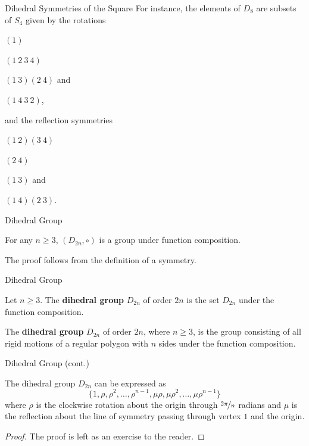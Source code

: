 \documentclass{beamer}
\begin{document}
\begin{frame}{Dihedral Symmetries of the Square}
For instance, the elements of $D_{8}$ are subsets of $S_4$ given by the rotations
\begin{enumerate}
\begin{multicols}{2}
    \item $(1)$
    \item $(1 \ 2 \ 3 \ 4)$
    \item $(1 \ 3)(2 \ 4)$ and
    \item $(1 \ 4 \ 3 \ 2)$,
    \end{multicols}
\end{enumerate}
and the reflection symmetries
\begin{enumerate}
\begin{multicols}{2}
    \item $(1 \ 2)(3 \ 4)$
    \item $(2 \ 4)$
    \item $(1 \ 3)$ and
    \item $(1 \ 4) (2 \ 3)$.
    \end{multicols}
\end{enumerate}
\end{frame}

\begin{frame}{Dihedral Group}
\begin{theorem}
\justifying
For any $n \geq 3$, $\left(D_{2n}, \circ\right)$ is a group under function composition.
\end{theorem}
\pause
\begin{theorem}
The proof follows from the definition of a symmetry.    
\end{theorem}
\end{frame}

\begin{frame}{Dihedral Group}
\begin{definition}
\justifying
Let $n \geq 3$. The \textbf{dihedral group} $D_{2n}$ of order $2n$ is the set $D_{2n}$ under the function composition.
\end{definition}
\pause
\begin{definition}[Restated]
\justifying
The \textbf{dihedral group} $D_{2n}$ of order $2n$, where $n \geq 3$, is the group consisting of all rigid motions of a regular polygon with $n$ sides under the function composition. 
\end{definition}    
\end{frame}

\begin{frame}{Dihedral Group (cont.)}    
\begin{lemma}
\justifying
The dihedral group $D_{2n}$ can be expressed as 
\[
\{1, \rho, \rho^2, \dots, \rho^{n-1}, \mu\rho, \mu\rho^2, \dots, \mu\rho^{n-1}\}
\]
where $\rho$ is the clockwise rotation about the origin through $\nicefrac{2\pi}{n}$ radians and $\mu$ is the reflection about the line of symmetry passing through vertex $1$ and the origin. 
\end{lemma}
\pause
\begin{proof}
The proof is left as an exercise to the reader.
\end{proof}
\end{frame}
\end{document}
